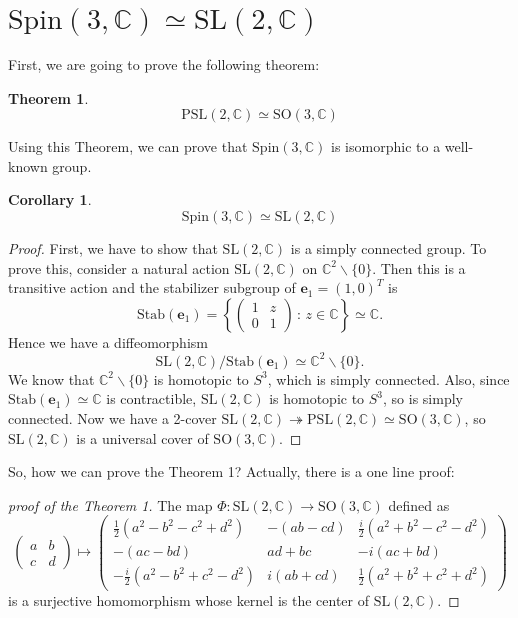 \documentclass{article}
\newtheorem{theorem}{Theorem}
\newtheorem{corollary}{Corollary}
\newcommand{\PSL}{\mathrm{PSL}}
\newcommand{\SO}{\mathrm{SO}}
\newcommand{\SL}{\mathrm{SL}}
\newcommand{\Spin}{\mathrm{Spin}}
\newcommand{\Stab}{\mathrm{Stab}}
\begin{document}
\section{$\Spin(3, \mathbb{C})\simeq \SL(2, \mathbb{C})$} 
First, we are going to prove the following theorem:
\begin{theorem}
$$
\mathrm{PSL}(2, \mathbb{C}) \simeq \mathrm{SO}(3, \mathbb{C})
$$
\end{theorem}
Using this Theorem, we can prove that  $\Spin(3, \mathbb{C})$ is isomorphic to  a well-known group.
\begin{corollary}
$$
\Spin(3, \mathbb{C})\simeq \SL(2, \mathbb{C})
$$
\end{corollary}
\begin{proof}
First, we have to show that $\SL(2, \mathbb{C})$ is a simply connected group. 
To prove this, consider a natural action $\SL(2, \mathbb{C})$ on $\mathbb{C}^{2}\backslash \{0\}$. 
Then this is a transitive action and the stabilizer subgroup of $\mathbf{e}_{1} = (1, 0)^{T}$ is 
$$
\Stab(\mathbf{e}_{1}) = \left\{ \begin{pmatrix} 1& z \\ 0 & 1 \end{pmatrix}\,:\, z\in \mathbb{C}\right\} \simeq \mathbb{C}.
$$
Hence we have a diffeomorphism 
$$
\SL(2, \mathbb{C})/\Stab(\mathbf{e}_{1})\simeq \mathbb{C}^{2}\backslash\{0\}.
$$
We know that $\mathbb{C}^{2}\backslash \{0\}$ is homotopic to $S^{3}$, which is simply connected. 
Also, since $\Stab(\mathbf{e}_{1})\simeq \mathbb{C}$ is contractible,  $\SL(2, \mathbb{C})$ is homotopic to $S^{3}$, so is simply connected. 
Now we have a 2-cover $\SL(2, \mathbb{C})\twoheadrightarrow \PSL(2, \mathbb{C})\simeq \SO(3, \mathbb{C})$, so $\SL(2, \mathbb{C})$ is a universal cover of $\SO(3, \mathbb{C})$. 
\end{proof}
So, how we can prove the Theorem 1? Actually, there is a one line proof:
\begin{proof}[proof of the Theorem 1]
The map $\Phi:\SL(2, \mathbb{C})\to \SO(3, \mathbb{C})$ defined as
$$
\begin{pmatrix}a&b\\c&d\end{pmatrix} \mapsto \begin{pmatrix} \frac{1}{2}(a^{2}-b^{2}-c^{2} + d^{2}) & -(ab-cd) & \frac{i}{2}(a^{2}+b^{2}-c^{2}-d^{2}) \\ -(ac-bd) & ad+bc & -i(ac+bd)  \\ 
-\frac{i}{2}(a^{2}-b^{2}+c^{2}-d^{2}) & i(ab+cd) & \frac{1}{2}(a^{2}+b^{2}+c^{2}+d^{2}) \end{pmatrix}
$$
is a surjective homomorphism whose kernel is the center of $\SL(2, \mathbb{C})$. 
\end{proof}
\end{document}
